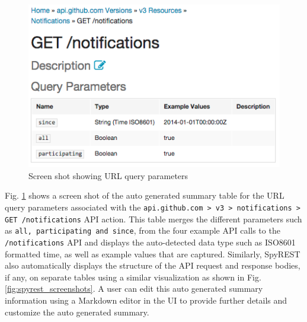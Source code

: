 \documentclass[conference]{IEEEtran}
\begin{document}
\begin{figure}[!tbh]
  \centering
  \includegraphics[width=\linewidth]{notifications_query.png}
  \caption{Screen shot showing URL query parameters}
  \label{fig:notifications_query}
\end{figure}

Fig. \ref{fig:notifications_query} shows a screen shot of the auto generated summary table for the URL query parameters associated with the \texttt{api.github.com > v3 > notifications > GET /notifications} API action. This table merges the different parameters such as \texttt{all, participating and since}, from the four example API calls to the \texttt{/notifications} API and displays the auto-detected data type such as ISO8601 formatted time, as well as example values that are captured. Similarly, SpyREST also automatically displays the structure of the API request and response bodies, if any, on separate tables using a similar visualization as shown in Fig. \ref{fig:spyrest_screenshots}. A user can edit this auto generated summary information using a Markdown editor in the UI to provide further details and customize the auto generated summary.
\end{document}
